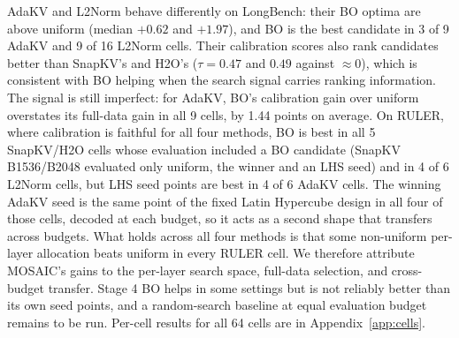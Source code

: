 \documentclass[11pt]{article}
\begin{document}
AdaKV and L2Norm behave differently on LongBench: their BO optima are above uniform (median $+0.62$ and $+1.97$), and BO is the best candidate in 3 of 9 AdaKV and 9 of 16 L2Norm cells. Their calibration scores also rank candidates better than SnapKV's and H2O's ($\tau = 0.47$ and $0.49$ against $\approx 0$), which is consistent with BO helping when the search signal carries ranking information. The signal is still imperfect: for AdaKV, BO's calibration gain over uniform overstates its full-data gain in all 9 cells, by 1.44 points on average. On RULER, where calibration is faithful for all four methods, BO is best in all 5 SnapKV/H2O cells whose evaluation included a BO candidate (SnapKV B1536/B2048 evaluated only uniform, the winner and an LHS seed) and in 4 of 6 L2Norm cells, but LHS seed points are best in 4 of 6 AdaKV cells. The winning AdaKV seed is the same point of the fixed Latin Hypercube design in all four of those cells, decoded at each budget, so it acts as a second shape that transfers across budgets. What holds across all four methods is that some non-uniform per-layer allocation beats uniform in every RULER cell. We therefore attribute MOSAIC's gains to the per-layer search space, full-data selection, and cross-budget transfer. Stage 4 BO helps in some settings but is not reliably better than its own seed points, and a random-search baseline at equal evaluation budget remains to be run. Per-cell results for all 64 cells are in Appendix~\ref{app:cells}.
\end{document}
